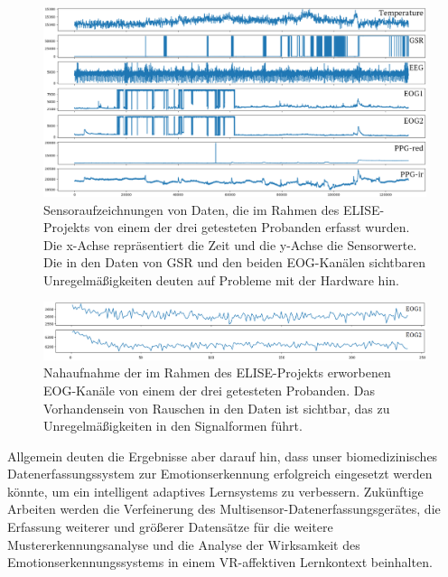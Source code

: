 \begin{figure}[h]
\includegraphics[width=\textwidth]{Images/bad_signals.png} 
\vspace{-0.3cm} \caption[Sensoraufzeichnungen von Daten]{ Sensoraufzeichnungen von Daten, die im Rahmen des ELISE-Projekts von einem der drei getesteten Probanden erfasst wurden. Die x-Achse repr{\"a}sentiert die Zeit und die y-Achse die Sensorwerte. Die in den Daten von GSR und den beiden EOG-Kan{\"a}len sichtbaren Unregelm{\"a}{\ss}igkeiten deuten auf Probleme mit der Hardware hin. }
\label{fig:bad_signals} \end{figure} \vspace{0.5cm}


\begin{figure}[h]
\includegraphics[width=\textwidth]{Images/zoom.png} 
\vspace{-0.3cm} \caption[Nahaufnahme von Rauschen in Daten]{ Nahaufnahme der im Rahmen des ELISE-Projekts erworbenen EOG-Kan{\"a}le von einem der drei getesteten Probanden. Das Vorhandensein von Rauschen in den Daten ist sichtbar, das zu Unregelm{\"a}{\ss}igkeiten in den Signalformen f{\"u}hrt. }
\label{fig:zoom} \end{figure} \vspace{0.5cm}



Allgemein deuten die Ergebnisse aber darauf hin, dass unser biomedizinisches Datenerfassungssystem zur Emotionserkennung erfolgreich eingesetzt werden k{\"o}nnte, um ein intelligent adaptives Lernsystems zu verbessern. Zuk{\"u}nftige Arbeiten werden die Verfeinerung des Multisensor-Datenerfassungsger{\"a}tes, die Erfassung weiterer und gr{\"o}{\ss}erer Datens{\"a}tze f{\"u}r die weitere Mustererkennungsanalyse und die Analyse der Wirksamkeit des Emotionserkennungssystems in einem VR-affektiven Lernkontext beinhalten.